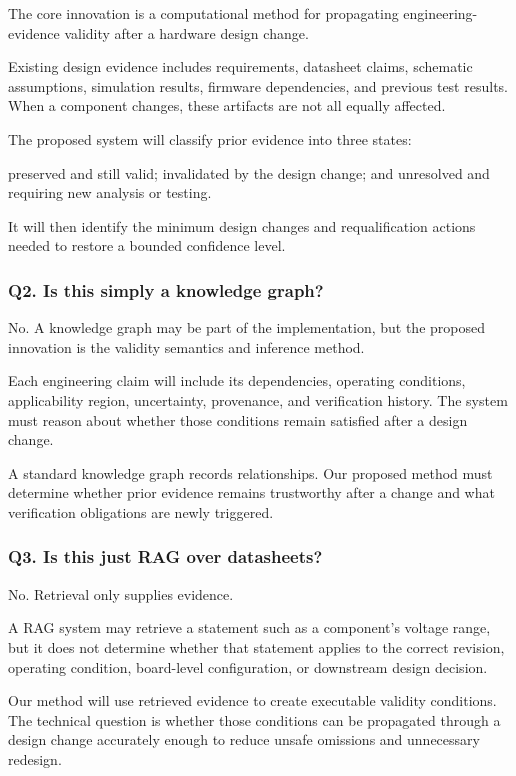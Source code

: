 \documentclass[12pt,letterpaper]{article}
\begin{document}
The core innovation is a computational method for propagating engineering-evidence validity after a hardware design change.

Existing design evidence includes requirements, datasheet claims, schematic assumptions, simulation results, firmware dependencies, and previous test results. When a component changes, these artifacts are not all equally affected.

The proposed system will classify prior evidence into three states:

preserved and still valid;
invalidated by the design change; and
unresolved and requiring new analysis or testing.

It will then identify the minimum design changes and requalification actions needed to restore a bounded confidence level.

\subsubsection{Q2. Is this simply a knowledge graph?}

No. A knowledge graph may be part of the implementation, but the proposed innovation is the validity semantics and inference method.

Each engineering claim will include its dependencies, operating conditions, applicability region, uncertainty, provenance, and verification history. The system must reason about whether those conditions remain satisfied after a design change.

A standard knowledge graph records relationships. Our proposed method must determine whether prior evidence remains trustworthy after a change and what verification obligations are newly triggered.

\subsubsection{Q3. Is this just RAG over datasheets?}

No. Retrieval only supplies evidence.

A RAG system may retrieve a statement such as a component's voltage range, but it does not determine whether that statement applies to the correct revision, operating condition, board-level configuration, or downstream design decision.

Our method will use retrieved evidence to create executable validity conditions. The technical question is whether those conditions can be propagated through a design change accurately enough to reduce unsafe omissions and unnecessary redesign.
\end{document}
